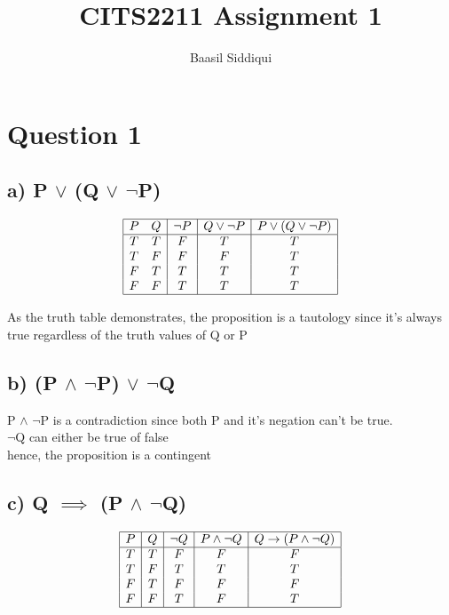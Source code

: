 \documentclass[a4paper]{article}
\title{\textbf{CITS2211 Assignment 1}}
\author{Baasil Siddiqui}
\date{}
\begin{document}
\maketitle
\thispagestyle{empty}

\section*{Question 1}


\subsection*{a) P $\lor$ (Q $\lor$ $\neg$P)}

\begin{displaymath}
    \begin{array}{|c c| c | c | c |}
        \hline
        P & Q & \neg P & Q \lor \neg P & P \lor (Q \lor \neg P)\\
        \hline
        T & T & F & T & T\\
        T & F & F & F & T\\
        F & T & T & T & T\\
        F & F & T & T & T\\
        \hline
    \end{array}
\end{displaymath}

As the truth table demonstrates, the proposition is a tautology since
it's always true regardless of the truth values of Q or P


\subsection*{b) (P $\land$ $\neg$P) $\lor$ $\neg$Q}

P $\land$ $\neg$P is a contradiction since both P and it's negation can't be
true.\\
$\neg$Q can either be true of false\\
hence, the proposition is a contingent


\subsection*{c) Q $\implies$ (P $\land$ $\neg$Q)}

\begin{displaymath}
    \begin{array}{|c|c|c|c|c|}
        \hline
        P & Q & \neg Q & P \land \neg Q & Q \rightarrow (P \land \neg Q) \\
        \hline
        T & T & F & F & F \\
        T & F & T & T & T \\
        F & T & F & F & F \\
        F & F & T & F & T \\
        \hline
    \end{array}
\end{displaymath}
\end{document}
